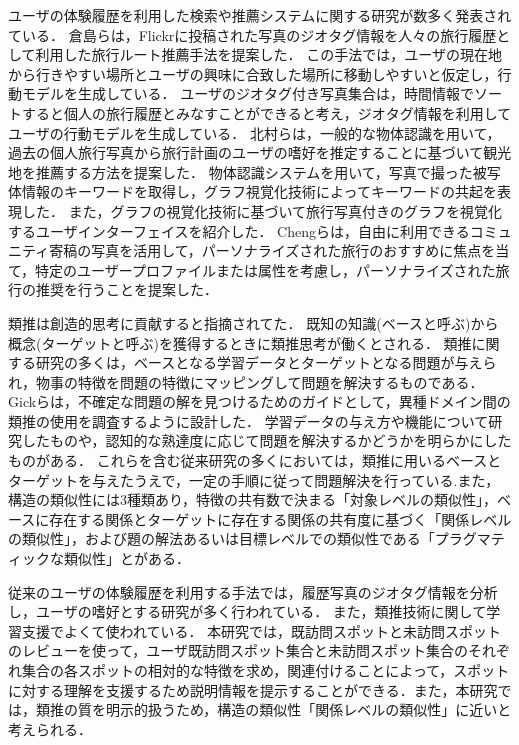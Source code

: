 \documentclass{deimj}
\begin{document}
ユーザの体験履歴を利用した検索や推薦システムに関する研究が数多く発表されている．
倉島ら\cite{Codd07}は，Flickrに投稿された写真のジオタグ情報を人々の旅行履歴として利用した旅行ルート推薦手法を提案した．
この手法では，ユーザの現在地から行きやすい場所とユーザの興味に合致した場所に移動しやすいと仮定し，行動モデルを生成している．
ユーザのジオタグ付き写真集合は，時間情報でソートすると個人の旅行履歴とみなすことができると考え，ジオタグ情報を利用してユーザの行動モデルを生成している．
北村らは\cite{Codd08}，一般的な物体認識を用いて，過去の個人旅行写真から旅行計画のユーザの嗜好を推定することに基づいて観光地を推薦する方法を提案した．
物体認識システムを用いて，写真で撮った被写体情報のキーワードを取得し，グラフ視覚化技術によってキーワードの共起を表現した．
また，グラフの視覚化技術に基づいて旅行写真付きのグラフを視覚化するユーザインターフェイスを紹介した．
Chengらは\cite{Codd09}，自由に利用できるコミュニティ寄稿の写真を活用して，パーソナライズされた旅行のおすすめに焦点を当て，特定のユーザープロファイルまたは属性を考慮し，パーソナライズされた旅行の推奨を行うことを提案した．

類推は創造的思考に貢献すると指摘されてた\cite{Codd01}．
既知の知識(ベースと呼ぶ)から概念(ターゲットと呼ぶ)を獲得するときに類推思考が働くとされる\cite{Codd02}．
類推に関する研究の多くは，ベースとなる学習データとターゲットとなる問題が与えられ，物事の特徴を問題の特徴にマッピングして問題を解決するもの\cite{Codd03}である．
Gickらは，不確定な問題の解を見つけるためのガイドとして，異種ドメイン間の類推の使用を調査するように設計した．
学習データの与え方や機能について研究したもの\cite{Codd04}や，認知的な熟達度に応じて問題を解決するかどうかを明らかにしたもの\cite{Codd05}がある．
これらを含む従来研究の多くにおいては，類推に用いるベースとターゲットを与えたうえで，一定の手順に従って問題解決を行っている.また，構造の類似性には3種類あり，特徴の共有数で決まる「対象レベルの類似性」，ベースに存在する関係とターゲットに存在する関係の共有度に基づく「関係レベルの類似性」，および題の解法あるいは目標レベルでの類似性である「プラグマティックな類似性」とがある．

従来のユーザの体験履歴を利用する手法では，履歴写真のジオタグ情報を分析し，ユーザの嗜好とする研究が多く行われている．
また，類推技術に関して学習支援でよくて使われている．
本研究では，既訪問スポットと未訪問スポットのレビューを使って，ユーザ既訪問スポット集合と未訪問スポット集合のそれぞれ集合の各スポットの相対的な特徴を求め，関連付けることによって，スポットに対する理解を支援するため説明情報を提示することができる．また，本研究では，類推の質を明示的扱うため，構造の類似性「関係レベルの類似性」に近いと考えられる．
\end{document}
